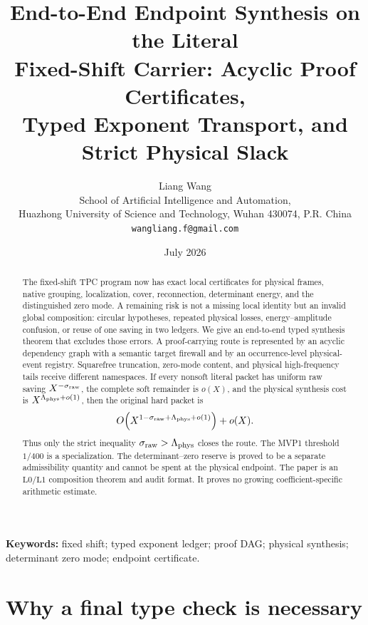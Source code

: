 \documentclass[11pt]{article}
\title{\textbf{End-to-End Endpoint Synthesis on the Literal}\\
\textbf{Fixed-Shift Carrier: Acyclic Proof Certificates,}\\
\textbf{Typed Exponent Transport, and Strict Physical Slack}}
\author{Liang Wang\\
School of Artificial Intelligence and Automation,\\
Huazhong University of Science and Technology, Wuhan 430074, P.R. China\\
\texttt{wangliang.f@gmail.com}}
\date{July 2026}
\theoremstyle{definition}
\theoremstyle{remark}
\newcommand{\Lzero}{\mathrm{L0}}
\newcommand{\Lone}{\mathrm{L1}}
\begin{document}
\maketitle

\begin{abstract}
The fixed-shift TPC program now has exact local certificates for
physical frames, native grouping, localization, cover, reconnection,
determinant energy, and the distinguished zero mode.  A remaining
risk is not a missing local identity but an invalid global
composition: circular hypotheses, repeated physical losses,
energy--amplitude confusion, or reuse of one saving in two ledgers.
We give an end-to-end typed synthesis theorem that excludes those
errors.  A proof-carrying route is represented by an acyclic
dependency graph with a semantic target firewall and by an
occurrence-level physical-event registry.  Squarefree truncation,
zero-mode content, and physical high-frequency tails receive
different namespaces.  If every nonsoft literal packet has uniform
raw saving \(X^{-\sigma_{\rm raw}}\), the complete soft remainder is
\(o(X)\), and the physical synthesis cost is
\(X^{\Lambda_{\rm phys}+o(1)}\), then the original hard packet is
\[
 O\!\left(X^{1-\sigma_{\rm raw}+\Lambda_{\rm phys}+o(1)}\right)
 +o(X).
\]
Thus only the strict inequality
\(\sigma_{\rm raw}>\Lambda_{\rm phys}\) closes the route.  The
MVP1 threshold \(1/400\) is a specialization.  The
determinant--zero reserve is proved to be a separate admissibility
quantity and cannot be spent at the physical endpoint.  The paper is
an \(\Lzero/\Lone\) composition theorem and audit format.  It proves
no growing coefficient-specific arithmetic estimate.
\end{abstract}

\noindent\textbf{Keywords:} fixed shift; typed exponent ledger;
proof DAG; physical synthesis; determinant zero mode; endpoint
certificate.

\medskip
\noindent{}

\section{Why a final type check is necessary}
\end{document}

